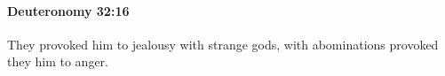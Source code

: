 
		\paragraph{Deuteronomy 32:16} %
			\label{DEUTERONOMY-32-16}

			They provoked him to jealousy with strange gods, with abominations provoked they him to anger.


